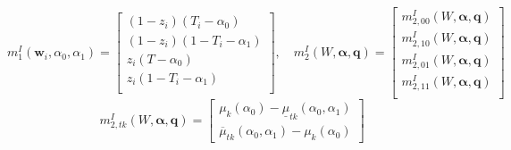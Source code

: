 \[
  m_1^I(\mathbf{w}_i, \alpha_0, \alpha_1) = \left[
  \begin{array}{l}
    (1 - z_i)(T_i - \alpha_0) \\
    (1 - z_i)(1 - T_i - \alpha_1) \\
    z_i(T - \alpha_0) \\
    z_i (1 - T_i - \alpha_1) \\
  \end{array}
\right], \quad
m^I_2(W, \boldsymbol{\alpha}, \mathbf{q}) = \left[
\begin{array}{c}
  m^I_{2,00}(W,\boldsymbol{\alpha},\mathbf{q})\\
  m^I_{2,10}(W,\boldsymbol{\alpha},\mathbf{q})\\
  m^I_{2,01}(W,\boldsymbol{\alpha},\mathbf{q})\\
  m^I_{2,11}(W,\boldsymbol{\alpha},\mathbf{q}) \\
\end{array}
\right]
\]
\[
  m_{2,tk}^I(W, \boldsymbol{\alpha}, \mathbf{q}) = \left[
  \begin{array}{c}
  \mu_k(\alpha_0) - \underline{\mu}_{tk}(\alpha_0, \alpha_1) \\
  \overline{\mu}_{tk}(\alpha_0, \alpha_1) - \mu_k(\alpha_0)  
  \end{array}
\right] 
\]



